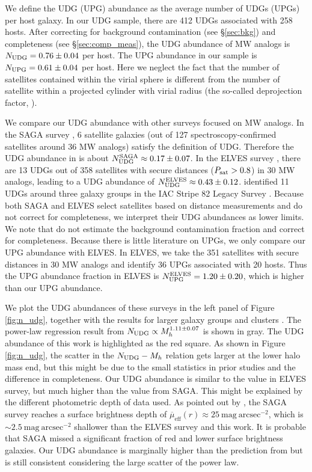 \documentclass[twocolumn,astrosymb,twocolappendix]{aastex631}
\newcommand{\sbunit}{\mathrm{mag\ arcsec}^{-2}}
\newcommand{\sbeffr}{\overline{\mu}_{\mathrm{eff}}(r)}
\begin{document}
\begin{CJK*}{UTF8}{gbsn}
We define the UDG (UPG) abundance as the average number of UDGs (UPGs) per host galaxy. In our UDG sample, there are 412 UDGs associated with 258 hosts. After correcting for background contamination (see \S \ref{sec:bkg}) and completeness (see \S \ref{sec:comp_meas}), the UDG abundance of MW analogs is $N_{\rm UDG} = 0.76\pm 0.04$ per host. The UPG abundance in our sample is $N_{\rm UPG} = 0.61\pm 0.04$ per host. Here we neglect the fact that the number of satellites contained within the virial sphere is different from the number of satellite within a projected cylinder with virial radius (the so-called deprojection factor, \citealt{vdBurg2017}).


We compare our UDG abundance with other surveys focused on MW analogs. In the SAGA survey \citep{SAGA-II}, 6 satellite galaxies (out of 127 spectroscopy-confirmed satellites around 36 MW analogs) satisfy the definition of UDG. Therefore the UDG abundance in \citet{SAGA-II} is about $N_{\rm UDG}^{\rm SAGA}\approx 0.17\pm0.07$. In the ELVES survey \citep{CarlstenELVES2022}, there are 13 UDGs out of 358 satellites with secure distances ($P_{\rm sat} > 0.8$) in 30 MW analogs, leading to a UDG abundance of $N_{\rm UDG}^{\rm ELVES} \approx 0.43\pm0.12$. \citet{Roman2017b} identified 11 UDGs around three galaxy groups in the IAC Stripe 82 Legacy Survey \citep{Fliri2016}. Because both SAGA and ELVES select satellites based on distance measurements and do not correct for completeness, we interpret their UDG abundances as lower limits. We note that \citet{Roman2017b} do not estimate the background contamination fraction and correct for completeness. Because there is little literature on UPGs, we only compare our UPG abundance with ELVES. In ELVES, we take the 351 satellites with secure distances in 30 MW analogs and identify 36 UPGs associated with 20 hosts. Thus the UPG abundance fraction in ELVES is $N_{\rm UPG}^{\rm ELVES} = 1.20 \pm 0.20$, which is higher than our UPG abundance. 

We plot the UDG abundances of these surveys in the left panel of Figure \ref{fig:n_udg}, together with the results for larger galaxy groups and clusters \citep{Koda2015,Munoz2015,Roman2017a,Roman2017b,Janssens2017,vdBurg2017}. 
The power-law regression result from \citet{vdBurg2017} $N_{\rm UDG} \propto M_h^{1.11\pm 0.07}$ is shown in gray. The UDG abundance of this work is highlighted as the red square. As shown in Figure \ref{fig:n_udg}, the scatter in the $N_{\rm UDG}-M_h$ relation gets larger at the lower halo mass end, but this might be due to the small statistics in prior studies and the difference in completeness. Our UDG abundance is similar to the value in ELVES survey, but much higher than the value from SAGA. This might be explained by the different photometric depth of data used. As pointed out by \citet{CarlstenELVES2022,Font2022}, the SAGA survey reaches a surface brightness depth of $\sbeffr\approx 25\ \sbunit$, which is $\sim 2.5\ \sbunit$ shallower than the ELVES survey and this work. It is probable that SAGA missed a significant fraction of red and lower surface brightness galaxies. Our UDG abundance is marginally higher than the prediction from \citet{vdBurg2017} but is still consistent considering the large scatter of the power law. 


\end{CJK*}
\end{document}
